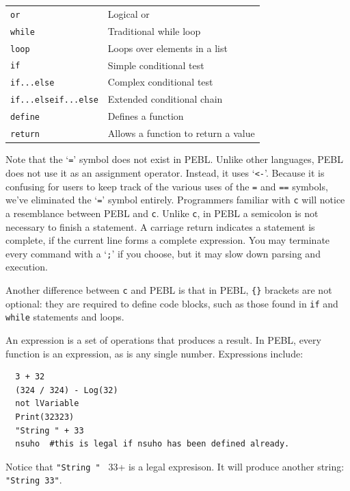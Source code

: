 \begin{table}[htbp]
\begin{tabular}{ll}
\texttt{or}    &               Logical or\\
\texttt{while} &               Traditional while loop\\
\texttt{loop}  &               Loops over elements in a list\\
\texttt{if}    &               Simple conditional test\\
\texttt{if...else}&            Complex conditional test\\
\texttt{if...elseif...else}&   Extended conditional chain\\
\texttt{define}   &            Defines a function\\
\texttt{return}&               Allows a function to return a value\\
\bottomrule
\end{tabular}
\label{tab:symbols}
\end{table}


Note that the `\verb+=+' symbol does not exist in PEBL. Unlike other languages, PEBL does not use it as an assignment operator. Instead, it uses `\verb+<-+'. Because it is confusing for users to keep track of the various uses of the \verb+=+ and \verb+==+ symbols, we've eliminated the `\verb+=+' symbol entirely. Programmers familiar with \texttt{c} will notice a resemblance between PEBL and \texttt{c}. Unlike \texttt{c}, in PEBL a semicolon is not necessary to finish a statement. A carriage return indicates a statement is complete, if the current line forms a complete expression. You may terminate every command with a `\texttt{;}' if you choose, but it may slow down parsing and execution.

Another difference between \texttt{c} and PEBL is that in PEBL, \verb+{}+ brackets are
not optional: they are required to define code blocks, such as those
found in \texttt{if} and \texttt{while} statements and loops.

\vfill
{}

An expression is a set of operations that produces a
result.  In PEBL, every function is an expression, as is any
single number. Expressions include:
\begin{verbatim}
  3 + 32
  (324 / 324) - Log(32)
  not lVariable
  Print(32323)
  "String " + 33
  nsuho  #this is legal if nsuho has been defined already.
\end{verbatim}

Notice that \verb+"String " + 33+ is a legal expresison. It will
produce another string: \verb+"String 33"+.

